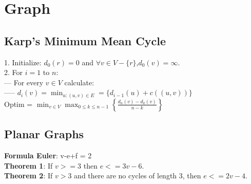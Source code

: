 \chapter{Graph}
\section{Karp's Minimum Mean Cycle}
1. Initialize: $d_0(r) = 0$ and $\forall v\in V - \{r\}$,$d_0(v) = \infty$.\\
2. For $i = 1$ to $n$:\\
--- For every $v\in V$ calculate:\\
----- $d_i(v) = \min_{u:(u,v)\in E} = \{d_{i - 1}(u) + c((u,v))\}$\\
Optim = $\min_{v\in V}\max_{0\leq k\leq n - 1}\left\{\frac{d_n(v) - d_k(v)}{n - k}\right\}$
\section{Planar Graphs}
\textbf{Formula Euler}: v-e+f = 2\\
\textbf{Theorem 1}: If $v>= 3$ then $e<=3v-6$.\\
\textbf{Theorem 2}: If $v>3$ and there are no cycles of length 3, then $e<= 2v-4$.\\
